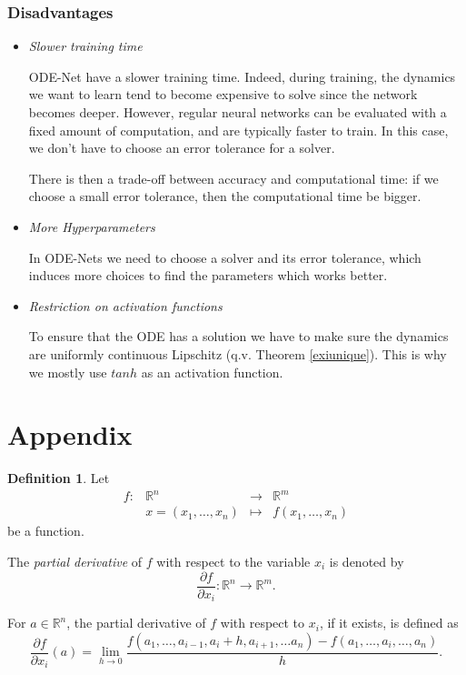 \documentclass[10pt,a4paper]{article}
\theoremstyle{definition}
\newtheorem{definition}{Definition}
\theoremstyle{definition}
\theoremstyle{definition}
\begin{document}
\subsubsection*{Disadvantages}
\begin{itemize}
\item \textit{Slower training time}

ODE-Net have a slower training time. Indeed, during training, the dynamics we want to learn tend to become expensive to solve since the network becomes deeper. However, regular neural networks can be evaluated with a fixed amount of computation, and are typically faster to train. In this case, we don't have to choose an error tolerance for a solver.

There is then a trade-off between accuracy and computational time: if we choose a small error tolerance, then the computational time be bigger.

\item \textit{More Hyperparameters}

In ODE-Nets we need to choose a solver and its error tolerance, which induces more choices to find the parameters which works better.

\item \textit{Restriction on activation functions}

To ensure that the ODE has a solution we have to make sure the dynamics are uniformly continuous Lipschitz (q.v. Theorem \ref{exiunique}). This is why we mostly use $tanh$ as an activation function.
\end{itemize}

\section{Appendix}\label{annex}

\begin{definition}
Let   $$\begin{array}{rclc}
f: & \mathbb{R}^n & \rightarrow &  \mathbb{R}^m \\
&x = (x_1, \dots, x_n) & \mapsto & f(x_1, \dots, x_n)
\end{array}$$ be a function.

The \textit{partial derivative} of $f$ with respect to the variable $x_i$ is denoted by
$$
\frac{\partial f}{\partial x_i} :\mathbb{R}^n \rightarrow \mathbb{R}^m.
$$

For $a\in \mathbb{R}^n$, the partial derivative of $f$ with respect to $x_i$, if it exists, is defined as
$$
\frac{\partial f}{\partial x_i}(a) = \lim_{h\rightarrow0}\frac{f(a_1,\dots , a_{i-1}, a_i + h, a_{i+1}, \dots a_n) - f(a_1,\dots, a_i,\dots, a_n)}{h}.
$$
\end{definition}
\end{document}
